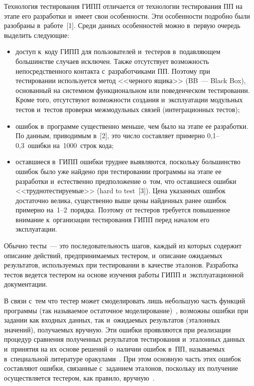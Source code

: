 \begin{multicols}{2}
        Технология тестирования ГИПП отличается от технологии 
тестирования ПП на этапе его разработки и~имеет свои особенности. Эти 
особенности подробно были разобраны в~работе~[1]. Среди данных 
особенностей можно в~первую очередь выделить следующие:
    \begin{itemize}
    \item доступ к~коду ГИПП для пользователей и~тестеров в~подавляющем 
большинстве случаев исключен. Также отсутствует возможность 
непосредственного контакта с~разработчиками ПП. Поэтому при 
тестировании используется метод <<черного ящика>> (BB~--- Black Box), 
основанный на системном функциональном или поведенческом 
тестировании. Кроме того, отсутствуют возможности создания 
и~эксплуатации модульных тестов и~тестов проверки межмодульных связей 
(интеграционных тестов);    
    \item ошибок в~программе существенно меньше, чем было на этапе ее 
разработки. По данным, приводимым в~[2], это число составляет примерно 
0,1--0,3~ошибки на~1000~строк кода;
    \item  оставшиеся в~ГИПП ошибки труднее выявляются, поскольку 
большинство ошибок было уже найдено при тестировании программы на 
этапе ее разработки и~естественно предположение о~том, что оставшиеся 
ошибки <<труд\-но\-тес\-ти\-ру\-емые>> (hard to test~[3]). Цена указанных ошибок 
достаточно велика, существенно выше цены найденных ранее ошибок 
примерно на~1--2~порядка. Поэтому от тестеров требуется повышенное 
внимание к~организации тестирования ГИПП перед началом его 
эксплуатации.
    \end{itemize}
    
    Обычно тесты~--- это последовательность шагов, каждый из которых 
содержит описание действий, предпринимаемых тестером, и~описание 
ожи\-да\-емых результатов, используемых при тестировании в~качестве 
эталонов. Разработка тестов ведется тестером на основе изучения работы 
ГИПП и~эксплуатационной документации.
    
    В связи с~тем что тестер может смоделировать лишь небольшую часть 
функций программы (так называемое остаточное моделирование)~\cite{7-bf}, 
возможны ошибки при задании как входных данных, так и~ожидаемых 
результатов (эталонных значений), получаемых вручную. Эти ошибки 
проявляются при реализации процедур сравнения полученных результатов 
тестирования и~эталонных данных и~принятия на их основе решений 
о~наличии ошибок в~ПП, называемых в~специальной литературе 
оракулами~\cite{4-bf}. При этом основную часть этих ошибок составляют 
ошибки, связанные с~заданием эталонов, поскольку их получение 
осуществляется тестером, как правило, вручную~\cite{2-bf}.
    

\end{multicols}
